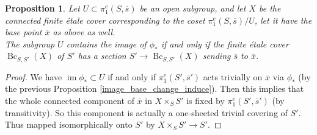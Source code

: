 \documentclass{article}
\theoremstyle{plain}
\newtheorem{proposition}[theorem]{Proposition}
\theoremstyle{definition}
\DeclareMathOperator{\Bc}{Bc}
\DeclareMathOperator{\im}{im}
\begin{document}
\begin{proposition}
\label{base_chage_image_last}
    Let $U\subset \pi^e_1(S,\overline{s})$ be an open subgroup, and let $X$ be the connected finite \'etale cover corresponding to the coset $\pi^e_1(S,\overline{s})/U$, let it have the base point $\overline{x}$ as above as well.\\
    The subgroup $U$ contains the image of $\phi_*$ if and only if the finite \'etale cover $\Bc_{S,S'}(X)$ of $S'$ has a section $S'\rightarrow \Bc_{S,S'}(X)$ sending $\overline{s}$ to $\overline{x}$.
\end{proposition}
\begin{proof}
    We have $\im \phi_*\subset U$ if and only if $\pi^e_1(S',\overline{s}')$ acts trivially on $\overline{x}$ via $\phi_*$ (by the previous Proposition \ref{image_base_change_induce}).
    Then this implies that the whole connected component of $\overline{x}$ in $X\times_SS'$ is fixed by $\pi^e_1(S',\overline{s}')$ (by transitivity).
    So this component is actually a one-sheeted trivial covering of $S'$. Thus mapped isomorphically onto $S'$ by $X\times_SS'\rightarrow S'$.
\end{proof}
\end{document}

